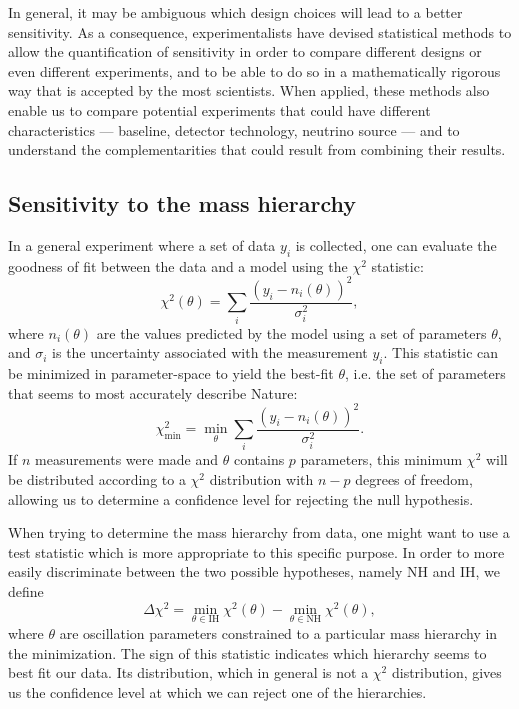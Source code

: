 In general, it may be ambiguous which design choices will lead to a better
sensitivity.  As a consequence, experimentalists have devised statistical
methods to allow the quantification of sensitivity in order to compare
different designs or even different experiments, and to be able to do so in a
mathematically rigorous way that is accepted by the most scientists.
When applied, these methods also enable us to compare potential experiments that
could have different characteristics --- baseline, detector technology,
neutrino source --- and to understand the complementarities that could result
from combining their results.



\subsection{Sensitivity to the mass hierarchy}
In a general experiment where a set of data $y_i$ is collected, one can
evaluate the goodness of fit between the data and a model using the
$\chi^2$ statistic:
\begin{equation}
	\chi^2(\theta) = \sum_i \frac{(y_i -
	n_i(\theta))^2}{\sigma^2_i},\label{eq:chisq}
\end{equation}
where $n_i(\theta)$ are the values predicted by the model using a set of parameters
$\theta$, and $\sigma_i$ is the uncertainty associated with the measurement $y_i$.
This statistic can be minimized in parameter-space to yield the best-fit
$\theta$, i.e. the set of parameters that seems to most accurately describe Nature:
\begin{equation}\chi^2_\text{min} = \min_\theta \sum_i \frac{(y_i -
n_i(\theta))^2}{\sigma^2_i}.\label{eq:c2_min}\end{equation}
If $n$ measurements were made and $\theta$ contains $p$ parameters, this
minimum $\chi^2$ will be distributed according to a $\chi^2$ distribution with
$n-p$ degrees of freedom, allowing us to determine a confidence level for
rejecting the null hypothesis.

When trying to determine the mass hierarchy from data, one might want to use a
test statistic which is more appropriate to this specific purpose. In order to
more easily discriminate between the two possible hypotheses, namely NH and IH,
we define
\begin{equation}\Delta \chi^2 = \min_{\theta \in \text{IH}} \chi^2(\theta) - \min_{\theta \in
\text{NH}} \chi^2(\theta),\label{eq:dc2}\end{equation}
where $\theta$ are oscillation parameters constrained to a particular mass
hierarchy in the minimization. The sign of this statistic indicates which
hierarchy seems to best fit our data. Its distribution, which in general is not
a $\chi^2$ distribution, gives us the confidence level at which we can reject
one of the hierarchies.

